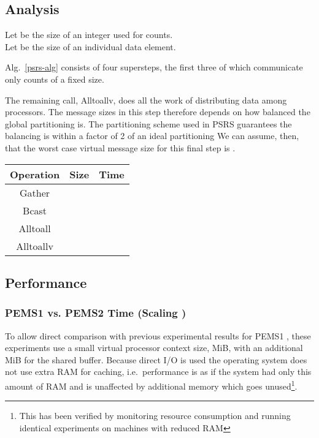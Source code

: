\documentclass[12pt]{carletoncsthesis}
\begin{document}
\subsection{Analysis}


Let  be the size of an integer used for counts.\\
Let  be the size of an individual data element.

Alg.~\ref{psrs-alg} consists of four supersteps, the first three of which
communicate only counts of a fixed size.

The remaining call, Alltoallv, does all the work of distributing data among
processors.  The message sizes in this step therefore depends on how balanced
the global partitioning is.  The partitioning scheme used in PSRS guarantees
the balancing is within a factor of 2 of an ideal partitioning \cite{psrs}
We can assume, then, that the worst case virtual message size for this final
step is .

\begin{center}
\begin{tabular}[ht]{ccc}
Operation & Size & Time \\ \hline
Gather    &  &
	 \\
Bcast     &  &
	 \\
Alltoall &  &
	 \\
Alltoallv  &  &
	 \\
\end{tabular}
\end{center}

\subsection{Performance}
\label{psrs-results}


\subsubsection{PEMS1 vs. PEMS2 Time (Scaling )}
\label{vs_small}


To allow direct comparison with previous experimental results for
PEMS1 \cite{mnthesis}, these experiments use a small virtual processor context
size,  MiB, with an additional  MiB for the shared buffer.
Because direct I/O is used the operating system does not use extra RAM
for caching, i.e.\ performance is as if the system had only this amount of
RAM and is unaffected by additional memory which goes unused\footnote{This
has been verified by monitoring resource consumption and running identical
experiments on machines with reduced RAM}.
\end{document}
